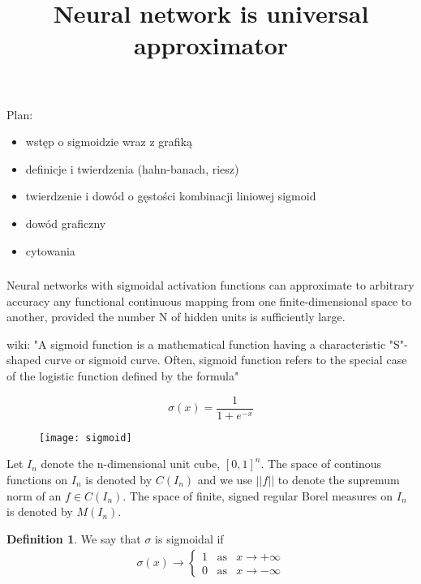 \documentclass[]{article}
\title{Neural network is universal approximator}
\author{}
\theoremstyle{definition}
\newtheorem{definition}{Definition}[section]
\begin{document}
\maketitle
Plan:
\begin{itemize}
	\item wstęp o sigmoidzie wraz z grafiką
	\item definicje i twierdzenia (hahn-banach, riesz)
	\item twierdzenie i dowód o gęstości kombinacji liniowej sigmoid
	\item dowód graficzny
	\item cytowania
\end{itemize}


\subsubsection{}

Neural networks with sigmoidal activation functions can approximate to arbitrary accuracy any functional continuous mapping from one finite-dimensional space to another, provided the number N of hidden units is sufficiently large.

		

wiki: "A sigmoid function is a mathematical function having a characteristic "S"-shaped curve or sigmoid curve. Often, sigmoid function refers to the special case of the logistic function defined by the formula"

$$
\sigma(x) = \frac{1}{1+e^{-x}}
$$


\begin{figure}[h]
	\centering
	\texttt{[image: sigmoid]}
\end{figure}

\newpage

Let $I_n$ denote the n-dimensional unit cube, $[0,1]^n$. The space of continous functions on $I_n$ is denoted by $C(I_n)$ and we use $||f||$ to denote the supremum norm of an $f \in C(I_n)$. The space of finite, signed regular Borel measures on $I_n$ is denoted by $M(I_n)$.



\begin{definition}
	We say that $\sigma$ is sigmoidal if
	\begin{eqnarray*}
		\sigma(x) \rightarrow \begin{cases} 1 \;\;\;\text{as} &x \rightarrow +\infty\\ 0 \;\;\;\text{as} &x \rightarrow -\infty\end{cases}
	\end{eqnarray*}
	
\end{definition}
\end{document}
